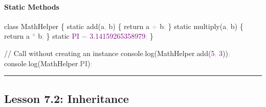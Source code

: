 \documentclass[
  justified,
  openright,
]{tufte-book}
\let\subsubsection\paragraph
\let\paragraph\paragraph
\newcommand{\AttributeTok}[1]{\textcolor{DarkSlateGray}{#1}}
\newcommand{\BuiltInTok}[1]{#1}
\newcommand{\CommentTok}[1]{\textcolor{MidGray}{#1}}
\newcommand{\ConstantTok}[1]{\textcolor{Purple}{#1}}
\newcommand{\ControlFlowTok}[1]{\textcolor{BrandBlue}{#1}}
\newcommand{\DecValTok}[1]{\textcolor{Purple}{#1}}
\newcommand{\FloatTok}[1]{\textcolor{Purple}{#1}}
\newcommand{\FunctionTok}[1]{\textcolor{BrandBlue}{#1}}
\newcommand{\KeywordTok}[1]{\textcolor{BrandBlue}{#1}}
\newcommand{\NormalTok}[1]{#1}
\newcommand{\OperatorTok}[1]{\textcolor{DarkGray}{#1}}
\newenvironment{Shaded}{%
  \begin{snugshade}
}{%
  \end{snugshade}
}
\let\subsubsection\paragraph
\let\paragraph\paragraph
\begin{document}
\subsubsection{Static Methods}\label{static-methods}

\begin{Shaded}
\begin{Highlighting}[]
\KeywordTok{class}\NormalTok{ MathHelper \{}
  \KeywordTok{static} \FunctionTok{add}\NormalTok{(a}\OperatorTok{,}\NormalTok{ b) \{}
    \ControlFlowTok{return}\NormalTok{ a }\OperatorTok{+}\NormalTok{ b}\OperatorTok{;}
\NormalTok{  \}}
  \KeywordTok{static} \FunctionTok{multiply}\NormalTok{(a}\OperatorTok{,}\NormalTok{ b) \{}
    \ControlFlowTok{return}\NormalTok{ a }\OperatorTok{*}\NormalTok{ b}\OperatorTok{;}
\NormalTok{  \}}
  \KeywordTok{static} \ConstantTok{PI} \OperatorTok{=} \FloatTok{3.14159265358979}\OperatorTok{;}
\NormalTok{\}}

\CommentTok{// Call without creating an instance}
\BuiltInTok{console}\OperatorTok{.}\FunctionTok{log}\NormalTok{(MathHelper}\OperatorTok{.}\FunctionTok{add}\NormalTok{(}\DecValTok{5}\OperatorTok{,} \DecValTok{3}\NormalTok{))}\OperatorTok{;}
\BuiltInTok{console}\OperatorTok{.}\FunctionTok{log}\NormalTok{(MathHelper}\OperatorTok{.}\AttributeTok{PI}\NormalTok{)}\OperatorTok{;}
\end{Highlighting}
\end{Shaded}

\begin{center}\rule{0.5\linewidth}{0.5pt}\end{center}

\subsection{Lesson 7.2: Inheritance}\label{lesson-7.2-inheritance}
\end{document}
